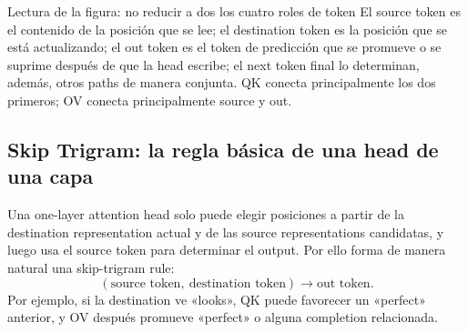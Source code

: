 

\begin{knowledgebox}{Lectura de la figura: no reducir a dos los cuatro roles de token}
El source token es el contenido de la posición que se lee; el destination token es la posición que se está actualizando; el out token es el token de predicción que se promueve o se suprime después de que la head escribe; el next token final lo determinan, además, otros paths de manera conjunta. QK conecta principalmente los dos primeros; OV conecta principalmente source y out.
\end{knowledgebox}


\subsection{Skip Trigram: la regla básica de una head de una capa}

Una one-layer attention head solo puede elegir posiciones a partir de la destination representation actual y de las source representations candidatas, y luego usa el source token para determinar el output. Por ello forma de manera natural una skip-trigram rule:
\[
(\text{source token},\ \text{destination token})
\longrightarrow \text{out token}.
\]
Por ejemplo, si la destination ve «looks», QK puede favorecer un «perfect» anterior, y OV después promueve «perfect» o alguna completion relacionada.



